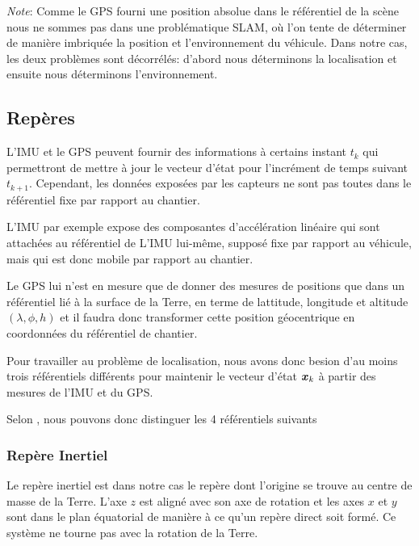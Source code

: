 \documentclass[12pt,a4paper]{report}
\begin{document}
	\para \textit{Note}: Comme le GPS fourni une position absolue dans le référentiel de la scène nous ne sommes pas dans une problématique SLAM, où l'on tente de déterminer de manière imbriquée la position et l'environnement du véhicule. Dans notre cas, les deux problèmes sont décorrélés: d'abord nous déterminons la localisation et ensuite nous déterminons l'environnement. 
	
	\subsection{Repères}
	
	\para L'IMU et le GPS peuvent fournir des informations à certains instant $t_k$ qui permettront de mettre à jour le vecteur d'état pour l'incrément de temps suivant $t_{k+1}$. Cependant, les données exposées par les capteurs ne sont pas toutes dans le référentiel fixe par rapport au chantier.
	
	\para L'IMU par exemple expose des composantes d'accélération linéaire qui sont attachées au référentiel de L'IMU lui-même, supposé fixe par rapport au véhicule, mais qui est donc mobile par rapport au chantier.
	
	\para Le GPS lui n'est en mesure que de donner des mesures de positions que dans un référentiel lié à la surface de la Terre, en terme de lattitude, longitude et altitude $(\lambda, \phi, h)$ et il faudra donc transformer cette position géocentrique en coordonnées du référentiel de chantier.
	
	\para Pour travailler au problème de localisation, nous avons donc besion d'au moins trois référentiels différents pour maintenir le vecteur d'état $\boldsymbol{x}_k$ à partir des mesures de l'IMU et du GPS.
	
	\para Selon \cite{gustavsson_uav_2015}, nous pouvons donc distinguer les 4 référentiels suivants
	
	\subsubsection{Repère Inertiel}
	Le repère inertiel est dans notre cas le repère dont l'origine se trouve au centre de masse de la Terre. L'axe $z$ est aligné avec son axe de rotation et les axes $x$ et $y$ sont dans le plan équatorial de manière à ce qu'un repère direct soit formé. Ce système ne tourne pas avec la rotation de la Terre.
	
\end{document}
